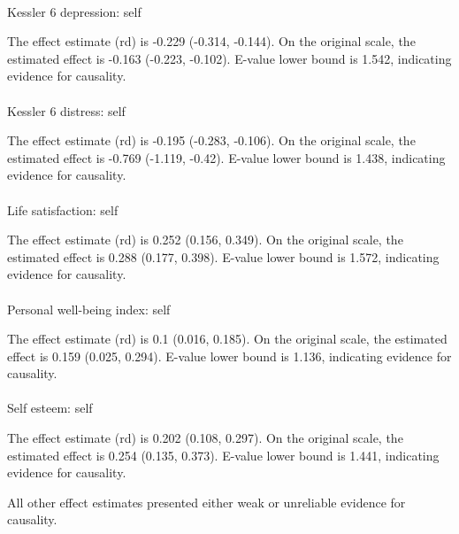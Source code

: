 \documentclass[
  single column]{article}
\makeatletter
\let\oldparagraph\paragraph
\renewcommand{\paragraph}{
    \@ifstar
      \xxxParagraphStar
      \xxxParagraphNoStar
  }
\newcommand{\xxxParagraphStar}[1]{\oldparagraph*{#1}\mbox{}}
\newcommand{\xxxParagraphNoStar}[1]{\oldparagraph{#1}\mbox{}}
\makeatother
\begin{document}
\paragraph{Kessler 6 depression:
self}\label{kessler-6-depression-self-5}

The effect estimate (rd) is -0.229 (-0.314, -0.144). On the original
scale, the estimated effect is -0.163 (-0.223, -0.102). E-value lower
bound is 1.542, indicating evidence for causality.

\paragraph{Kessler 6 distress: self}\label{kessler-6-distress-self-4}

The effect estimate (rd) is -0.195 (-0.283, -0.106). On the original
scale, the estimated effect is -0.769 (-1.119, -0.42). E-value lower
bound is 1.438, indicating evidence for causality.

\paragraph{Life satisfaction: self}\label{life-satisfaction-self-11}

The effect estimate (rd) is 0.252 (0.156, 0.349). On the original scale,
the estimated effect is 0.288 (0.177, 0.398). E-value lower bound is
1.572, indicating evidence for causality.

\paragraph{Personal well-being index:
self}\label{personal-well-being-index-self-6}

The effect estimate (rd) is 0.1 (0.016, 0.185). On the original scale,
the estimated effect is 0.159 (0.025, 0.294). E-value lower bound is
1.136, indicating evidence for causality.

\paragraph{Self esteem: self}\label{self-esteem-self-7}

The effect estimate (rd) is 0.202 (0.108, 0.297). On the original scale,
the estimated effect is 0.254 (0.135, 0.373). E-value lower bound is
1.441, indicating evidence for causality.

All other effect estimates presented either weak or unreliable evidence
for causality.
\end{document}
